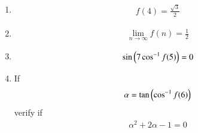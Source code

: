 \documentclass[journal,12pt,twocolumn]{IEEEtran}
\renewcommand\thesection{\arabic{section}}
\begin{document}
\begin{enumerate}[label=\thesection.\arabic*
,ref=\thesection.\theenumi]
\begin{multline}
= \frac{1}{2}\sbrak{\cos \theta_n-\cos \cbrak{\brak{2k+3}\theta_n}}
\end{multline}
from \eqref{eq:qp2_3_sum} and \eqref{eq:qp2_3_cosr},
\begin{align}
\label{eq:qp2_3_sum_sol}
f(n) & = \frac{n\cos \theta_n-\sum_{k=0}^{n}\cos \cbrak{\brak{2k+3}\theta_n}}{n-\sum_{k=0}^{n}\cos\cbrak{\brak{2k+4}\theta_n}}
\nonumber \\
&= \frac{n\cos \brak{\frac{\pi}{n+2}}+\cos \brak{\frac{\pi}{n+2}}}{n+\cos\brak{\frac{2\pi}{n+2}}}
\end{align}
resulting in \eqref{eq:qp2_3_sum_ans}.  Verify if 
\item 
\begin{align}
f(4) = \frac{\sqrt{3}}{2}
\end{align}
\item 
\begin{align}
\lim_{n \to \infty}f(n) = \frac{1}{2}
\end{align}
\item 
\begin{align}
\sin\left(7 \cos^{-1}f(5)\right) = 0
\end{align}
\item If 
\begin{align}
\alpha = 
\tan\left( \cos^{-1}f(6)\right) 
\end{align}
verify if 
\begin{align}
\alpha^2 +2\alpha -1 =  0 
\end{align}
\end{enumerate}
%
\end{document}
